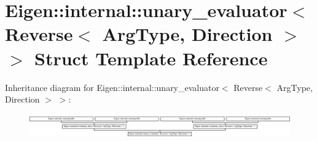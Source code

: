 \hypertarget{struct_eigen_1_1internal_1_1unary__evaluator_3_01_reverse_3_01_arg_type_00_01_direction_01_4_01_4}{}\section{Eigen\+:\+:internal\+:\+:unary\+\_\+evaluator$<$ Reverse$<$ Arg\+Type, Direction $>$ $>$ Struct Template Reference}
\label{struct_eigen_1_1internal_1_1unary__evaluator_3_01_reverse_3_01_arg_type_00_01_direction_01_4_01_4}
Inheritance diagram for Eigen\+:\+:internal\+:\+:unary\+\_\+evaluator$<$ Reverse$<$ Arg\+Type, Direction $>$ $>$\+:\begin{figure}[H]
\begin{center}
\leavevmode
\includegraphics[height=1.042184cm]{struct_eigen_1_1internal_1_1unary__evaluator_3_01_reverse_3_01_arg_type_00_01_direction_01_4_01_4}
\end{center}
\end{figure}

